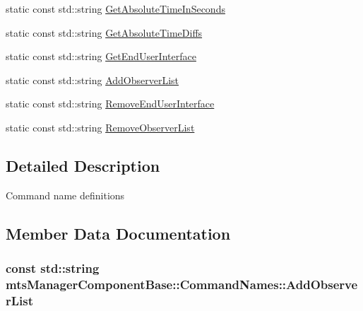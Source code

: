 \begin{DoxyCompactItemize}
\item 
static const std\+::string \hyperlink{classmts_manager_component_base_1_1_command_names_a35b8389a055af4cd8201da457ec4367b}{Get\+Absolute\+Time\+In\+Seconds}
\item 
static const std\+::string \hyperlink{classmts_manager_component_base_1_1_command_names_aa31a1e50a22f004b7a84d24572a7bf51}{Get\+Absolute\+Time\+Diffs}
\item 
static const std\+::string \hyperlink{classmts_manager_component_base_1_1_command_names_ab146a4659929f226e1ba7feddb5a6c0c}{Get\+End\+User\+Interface}
\item 
static const std\+::string \hyperlink{classmts_manager_component_base_1_1_command_names_a2f4a29c0b459f4c66df950d9139aa7ce}{Add\+Observer\+List}
\item 
static const std\+::string \hyperlink{classmts_manager_component_base_1_1_command_names_a741dd0ca8899fbd7caec506dba65359d}{Remove\+End\+User\+Interface}
\item 
static const std\+::string \hyperlink{classmts_manager_component_base_1_1_command_names_aea2b69069bf76d20bb93e0876f9f90da}{Remove\+Observer\+List}
\end{DoxyCompactItemize}


\subsection{Detailed Description}
Command name definitions 

\subsection{Member Data Documentation}
\hypertarget{classmts_manager_component_base_1_1_command_names_a2f4a29c0b459f4c66df950d9139aa7ce}{}
\subsubsection[{Add\+Observer\+List}]{\setlength{\rightskip}{0pt plus 5cm}const std\+::string mts\+Manager\+Component\+Base\+::\+Command\+Names\+::\+Add\+Observer\+List\hspace{0.3cm}{\ttfamily [static]}}\label{classmts_manager_component_base_1_1_command_names_a2f4a29c0b459f4c66df950d9139aa7ce}
\hypertarget{classmts_manager_component_base_1_1_command_names_a04c7cfcff4f8fb2714238b76f4dfcc1b}{}
